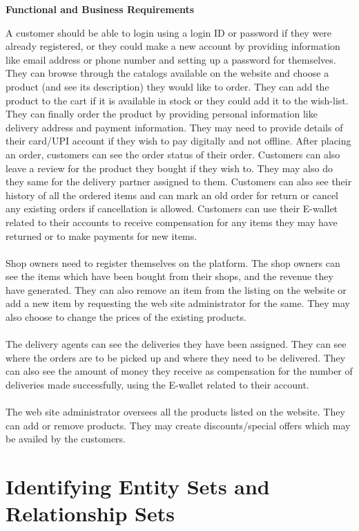 \documentclass[12pt]{article}
\begin{document}
\begin{center}
    \fontsize{30}{36}\selectfont\textbf{Functional and Business Requirements}
\end{center}A customer should be able to login using a login ID or password if they were already registered, or they could make a new account by providing information like email address or phone number and setting up a password for themselves. They can browse through the catalogs available on the website and choose a product (and see its description) they would like to order. They can add the product to the cart if it is available in stock or they could add it to the wish-list. They can finally order the product by providing personal information like delivery address and payment information. They may need to provide details of their card/UPI account if they wish to pay digitally and not offline. After placing an order, customers can see the order status of their order. Customers can also leave a review for the product they bought if they wish to. They may also do they same for the delivery partner assigned to them. Customers can also see their history of all the ordered items and can mark an old order for return or cancel any existing orders if cancellation is allowed. Customers can use their E-wallet related to their accounts to receive compensation for any items they may have returned or to make payments for new items.
\\
\\
Shop owners need to register themselves on the platform. The shop owners can see the items which have been bought from their shops, and the revenue they have generated. They can also remove an item from the listing on the website or add a new item by requesting the web site administrator for the same. They may also choose to change the prices of the existing products.
\\
\\
The delivery agents can see the deliveries they have been assigned. They can see where the orders are to be picked up and where they need to be delivered. They can also see the amount of money they receive as compensation for the number of deliveries made successfully, using the E-wallet related to their account.
\\
\\
The web site administrator oversees all the products listed on the website. They can add or remove products. They may create discounts/special offers which may be availed by the customers.

\section*{Identifying Entity Sets and Relationship Sets}
\end{document}
